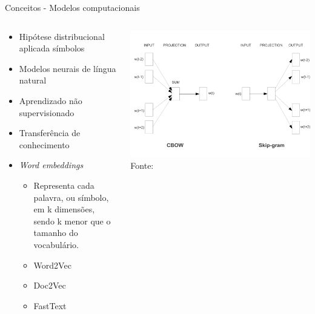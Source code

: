 \begin{frame}{Conceitos - Modelos computacionais}
\selectFont
\begin{columns}
	\begin{column}{0.60\textwidth}
		\begin{tcolorbox}[title=Modelo de representação distribuída,height=7cm,valign=center]\selectFont
			\begin{itemize}
				\item Hipótese distribucional aplicada símbolos
				\item Modelos neurais de língua natural \cite{Bengio2003}
				\item Aprendizado não supervisionado
				\item Transferência de conhecimento
				\item {\it Word embeddings} 
				\begin{itemize}\selectFont
					\item Representa cada palavra, ou símbolo, em k dimensões, sendo k menor que o tamanho do vocabulário.
					\item Word2Vec \cite{Mikolov2013}
					\item Doc2Vec \cite{QuocLe2014}
					\item FastText \cite{bojanowski2017enriching}
				\end{itemize}
			\end{itemize}
		\end{tcolorbox}		
	\end{column}
	\begin{column}{0.40\textwidth}
		\begin{tcolorbox}[title=Modelo Word2Vec,height=7cm,valign=center]\selectFont
			\includegraphics[trim=350 20 0 20,clip,width=.95\textwidth]{images/efficient-models.pdf}
			Fonte: 
		\end{tcolorbox}		
	\end{column}
\end{columns}
\end{frame}




